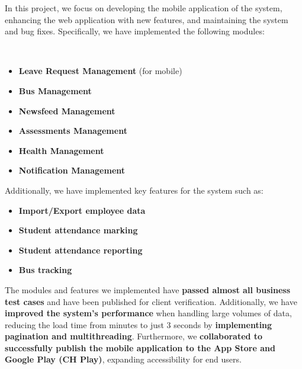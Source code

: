 \begin{minipage}{\textwidth}
    \setlength{\parindent}{2em}In this project, we focus on developing the mobile application of the system, enhancing the web application with new features, and maintaining the system and bug fixes. Specifically, we have implemented the following modules:
\end{minipage}\\
\begin{itemize}[itemsep=-0.05cm, topsep=0.1cm]
    \item \textbf{Leave Request Management} (for mobile)
    \item \textbf{Bus Management}
    \item \textbf{Newsfeed Management}
    \item \textbf{Assessments Management}
    \item \textbf{Health Management}
    \item \textbf{Notification Management}
\end{itemize}
\vspace{0.1cm}
\begin{minipage}{\textwidth}
    \setlength{\parindent}{2em}
   Additionally, we have implemented key features for the system such as:
\end{minipage}
\begin{itemize}[itemsep=-0.05cm, topsep=0.2cm]
    \item \textbf{Import/Export employee data}
    \item \textbf{Student attendance marking}
    \item \textbf{Student attendance reporting}
    \item \textbf{Bus tracking}
\end{itemize}
\vspace{0.2cm}
\begin{minipage}{\textwidth}
    \setlength{\parindent}{2em}The modules and features we implemented have \textbf{passed almost all business test cases} and have been published for client verification. Additionally, we have \textbf{improved the system's performance} when handling large volumes of data, reducing the load time from minutes to just 3 seconds by \textbf{implementing pagination and multithreading}. Furthermore, we \textbf{collaborated to successfully publish the mobile application to the App Store and Google Play (CH Play)}, expanding accessibility for end users.
\end{minipage}
